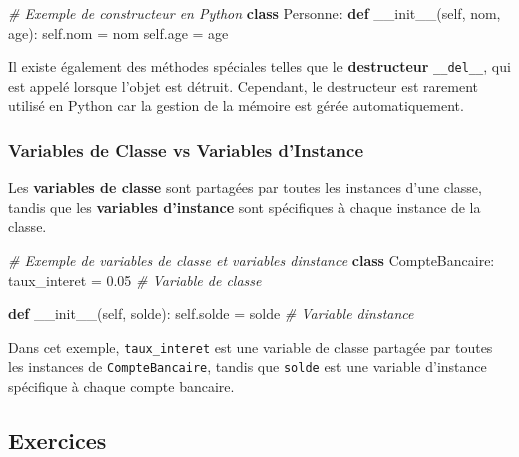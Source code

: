\documentclass[11pt]{article}
\newenvironment{Shaded}{}{}
\newcommand{\KeywordTok}[1]{\textcolor[rgb]{0.00,0.44,0.13}{\textbf{{#1}}}}
\newcommand{\FloatTok}[1]{\textcolor[rgb]{0.25,0.63,0.44}{{#1}}}
\newcommand{\CommentTok}[1]{\textcolor[rgb]{0.38,0.63,0.69}{\textit{{#1}}}}
\newcommand{\FunctionTok}[1]{\textcolor[rgb]{0.02,0.16,0.49}{{#1}}}
\newcommand{\NormalTok}[1]{{#1}}
\newcommand{\VariableTok}[1]{\textcolor[rgb]{0.10,0.09,0.49}{{#1}}}
\newcommand{\OperatorTok}[1]{\textcolor[rgb]{0.40,0.40,0.40}{{#1}}}
\begin{document}
\begin{Shaded}
\begin{Highlighting}[]
\CommentTok{\# Exemple de constructeur en Python}
\KeywordTok{class}\NormalTok{ Personne:}
    \KeywordTok{def} \FunctionTok{\_\_init\_\_}\NormalTok{(}\VariableTok{self}\NormalTok{, nom, age):}
        \VariableTok{self}\NormalTok{.nom }\OperatorTok{=}\NormalTok{ nom}
        \VariableTok{self}\NormalTok{.age }\OperatorTok{=}\NormalTok{ age}
\end{Highlighting}
\end{Shaded}

Il existe également des méthodes spéciales telles que le
\textbf{destructeur} \texttt{\_\_del\_\_}, qui est appelé lorsque
l'objet est détruit. Cependant, le destructeur est rarement utilisé en
Python car la gestion de la mémoire est gérée automatiquement.

\hypertarget{variables-de-classe-vs-variables-dinstance}{%
\subsubsection{Variables de Classe vs Variables
d'Instance}\label{variables-de-classe-vs-variables-dinstance}}

Les \textbf{variables de classe} sont partagées par toutes les instances
d'une classe, tandis que les \textbf{variables d'instance} sont
spécifiques à chaque instance de la classe.

\begin{Shaded}
\begin{Highlighting}[]
\CommentTok{\# Exemple de variables de classe et variables d\textquotesingle{}instance}
\KeywordTok{class}\NormalTok{ CompteBancaire:}
\NormalTok{    taux\_interet }\OperatorTok{=} \FloatTok{0.05}  \CommentTok{\# Variable de classe}

    \KeywordTok{def} \FunctionTok{\_\_init\_\_}\NormalTok{(}\VariableTok{self}\NormalTok{, solde):}
        \VariableTok{self}\NormalTok{.solde }\OperatorTok{=}\NormalTok{ solde  }\CommentTok{\# Variable d\textquotesingle{}instance}
\end{Highlighting}
\end{Shaded}

Dans cet exemple, \texttt{taux\_interet} est une variable de classe
partagée par toutes les instances de \texttt{CompteBancaire}, tandis que
\texttt{solde} est une variable d'instance spécifique à chaque compte
bancaire.

    \hypertarget{exercices}{%
\subsection{Exercices}\label{exercices}}
\end{document}
